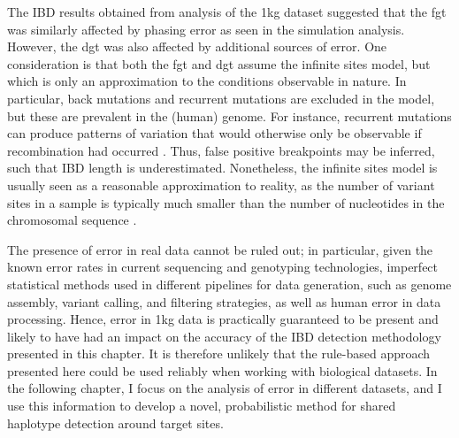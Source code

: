 The IBD results obtained from analysis of the \gls{1kg} dataset suggested that the \gls{fgt} was similarly affected by phasing error as seen in the simulation analysis.
However, the \gls{dgt} was also affected by additional sources of error.
One consideration is that both the \gls{fgt} and \gls{dgt} assume the infinite sites model, but which is only an approximation to the conditions observable in nature.
In particular, back mutations and recurrent mutations are excluded in the model, but these are prevalent in the (human) genome.
For instance, recurrent mutations can produce patterns of variation that would otherwise only be observable if recombination had occurred \citep{McVean:2002ws}.
Thus, false positive breakpoints may be inferred, such that IBD length is underestimated.
Nonetheless, the infinite sites model is usually seen as a reasonable approximation to reality, as the number of variant sites in a sample is typically much smaller than the number of nucleotides in the chromosomal sequence \citep{hein2004gene}.

The presence of error in real data cannot be ruled out; in particular, given the known error rates in current sequencing and genotyping technologies,
imperfect statistical methods used in different pipelines for data generation, such as genome assembly, variant calling, and filtering strategies, as well as human error in data processing.
Hence, error in \gls{1kg} data is practically guaranteed to be present and likely to have had an impact on the accuracy of the IBD detection methodology presented in this chapter.
It is therefore unlikely that the rule-based approach presented here could be used reliably when working with biological datasets.
In the following chapter, I focus on the analysis of error in different datasets, and I use this information to develop a novel, probabilistic method for shared haplotype detection around target sites.


%
